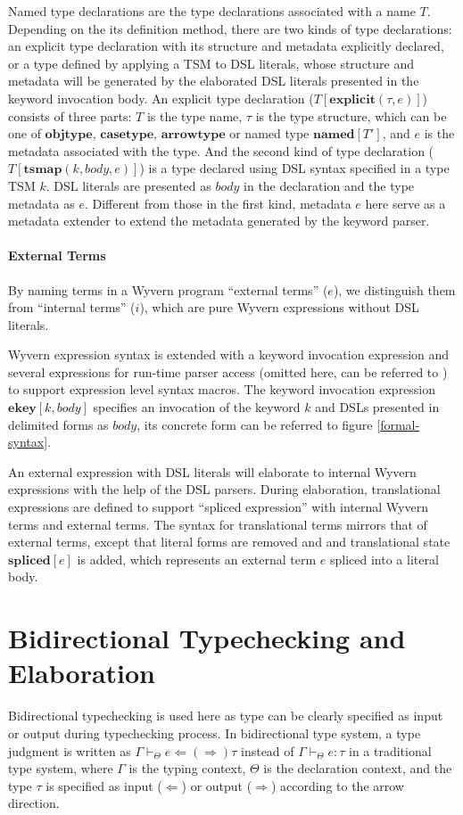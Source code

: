 \documentclass{sig-alternate}
\begin{document}
Named type declarations are the type declarations associated with a name $T$. Depending on the its definition method, there are two kinds of type declarations: an explicit type declaration with its structure and metadata explicitly declared, or a type defined by applying a TSM to DSL literals, whose structure and metadata will be generated by the elaborated DSL literals presented in the keyword invocation body. An explicit type declaration ($T[\mathbf{explicit}(\tau,e)]$) consists of three parts: $T$ is the type name, $\tau$ is the type structure, which can be one of $\mathbf{objtype}$, $\mathbf{casetype}$, $\mathbf{arrowtype}$ or named type $\mathbf{named}[T']$,  and $e$ is the metadata associated with the type. And the second kind of type declaration ($T[\mathbf{tsmap}(k,body,e)]$) is a type declared using DSL syntax specified in a type TSM $k$. DSL literals are presented as $body$ in the declaration and the type metadata as $e$. Different from those in the first kind, metadata $e$ here serve as a metadata extender to extend the metadata generated by the keyword parser.


\paragraph{External Terms}
By naming terms in a Wyvern program ``external terms'' ($e$), we distinguish them from ``internal terms'' ($i$), which are pure Wyvern expressions without DSL literals. 

Wyvern expression syntax is extended with a keyword invocation expression and several expressions for run-time parser access (omitted here, can be referred to ) to support expression level syntax macros. The keyword invocation expression $\mathbf{ekey}[k,body]$ specifies an invocation of the keyword $k$ and DSLs presented in delimited forms as $body$, its concrete form can be referred to figure \ref{formal-syntax}.

An external expression with DSL literals will elaborate to internal Wyvern expressions with the help of the DSL parsers. During elaboration, translational expressions  
are defined to support ``spliced expression'' with internal Wyvern terms and external terms. The syntax for translational terms mirrors that of external terms, except that literal forms are removed and and translational state $\mathbf{spliced}[e]$ is added, which represents an external term $e$ spliced into a literal body.

\section{Bidirectional Typechecking and Elaboration}
Bidirectional typechecking is used here as type can be clearly specified as input or output during typechecking process. In bidirectional type system, a type judgment is written as $\Gamma\vdash_{\Theta} e\Leftarrow(\Rightarrow)\tau$ instead of $\Gamma\vdash_{\Theta} e:\tau$ in a traditional type system, where $\Gamma$ is the typing context, $\Theta$ is the declaration context, and the type $\tau$ is specified as input ($\Leftarrow$) or output ($\Rightarrow$) according to the arrow direction. 
\end{document}
